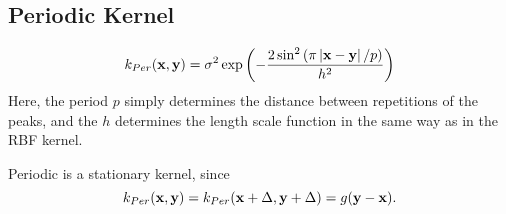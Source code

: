\subsection{Periodic Kernel}
\begin{definition}
	$$
	k_{Per}(\mathbf{x}, \mathbf{y}) = \sigma^{2} \exp \left(-\frac{2 \sin ^{2}\left(\pi\left|\mathbf{x}-\mathbf{y} \right| / p\right)}{h^{2}}\right)
	$$
	Here, the period $p$ simply determines the distance between repetitions of the peaks, and the $h$ determines the length scale function in the same way as in the RBF kernel.
\end{definition}
\begin{property}
	Periodic is a stationary kernel, since 
	\begin{equation}
		k_{Per}(\mathbf{x}, \mathbf{y}) = k_{Per}(\mathbf{x} + \Delta, \mathbf{y} + \Delta) = g(\mathbf{y} - \mathbf{x}).
	\end{equation}
\end{property}

